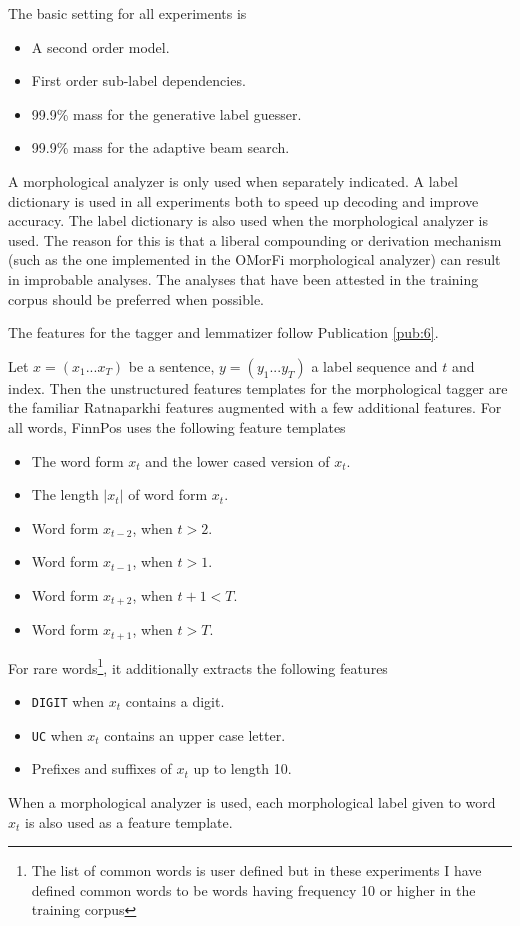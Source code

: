 The basic setting for all experiments is 
\begin{itemize}
\item A second order model.
\item First order sub-label dependencies.
\item 99.9\% mass for the generative label guesser.
\item 99.9\% mass for the adaptive beam search.
\end{itemize}
A morphological analyzer is only used when separately indicated. A
label dictionary is used in all experiments both to speed up decoding
and improve accuracy. The label dictionary is also used when the
morphological analyzer is used. The reason for this is that a liberal
compounding or derivation mechanism (such as the one implemented in
the OMorFi morphological analyzer) can result in improbable
analyses. The analyses that have been attested in the training corpus
should be preferred when possible.

The features for the tagger and lemmatizer follow
Publication \ref{pub:6}.

Let $x = (x_1 ... x_T)$ be a sentence, $y = (y_1 ... y_T)$ a label
sequence and $t$ and index. Then the unstructured features templates
for the morphological tagger are the familiar Ratnaparkhi features
\citep{Ratnaparkhi1998} augmented with a few additional features. For
all words, FinnPos uses the following feature templates
\begin{itemize}
\item The word form $x_t$ and the lower cased version of $x_t$.
\item The length $|x_t|$ of word form $x_t$.
\item Word form $x_{t-2}$, when $t > 2$.
\item Word form $x_{t-1}$, when $t > 1$.
\item Word form $x_{t+2}$, when $t + 1 < T$.
\item Word form $x_{t+1}$, when $t > T$.
\end{itemize}
For rare words\footnote{The list of common words is user defined but
  in these experiments I have defined common words to be words having
  frequency 10 or higher in the training corpus}, it additionally
extracts the following features
\begin{itemize}
\item {\tt DIGIT} when $x_t$ contains a digit.
\item {\tt UC} when $x_t$ contains an upper case letter.
\item Prefixes and suffixes of $x_t$ up to length 10.
\end{itemize}
When a morphological analyzer is used, each morphological label given
to word $x_t$ is also used as a feature template.


